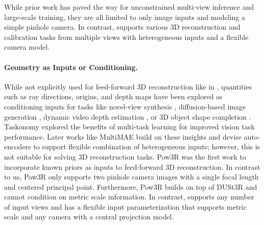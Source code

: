 While prior work has paved the way for unconstrained multi-view inference and large-scale training, they are all limited to only image inputs and modeling a simple pinhole camera. %
In contrast, \coolname supports various 3D reconstruction and calibration tasks from multiple views with heterogeneous inputs and a flexible camera model.


\paragraph{Geometry as Inputs or Conditioning.}

While not explicitly used for feed-forward 3D reconstruction like in \coolname,
quantities such as ray directions, origins, and depth maps have been explored as conditioning inputs for tasks like novel-view synthesis
\cite{JinJTZBZLSX2025, LuZFNTQCYL2025, WeberMKAZKR2026, ZhouGVVYBTRJ2025}, 
diffusion-based image generation
\cite{MouWXWZQSQ2024, ZhangRA2023}, 
dynamic video depth estimation \cite{LuHLDLCDYWL2025}, or
3D object shape completion \cite{DuistOWBRI2025}.
Taskonomy \cite{ZamirSSGMS2018} explored
the benefits of multi-task learning for improved vision task performance.
Later works like MultiMAE \cite{BachmMAZ2022} build on these insights and devise auto-encoders to support flexible combination of heterogeneous inputs; however, this is not suitable for solving 3D reconstruction tasks.
Pow3R \cite{JangWLAR2025} was the first work to incorporate known priors as inputs to feed-forward 3D reconstruction.
In contrast to us, Pow3R only supports two pinhole camera images with a single focal length and centered principal point.
Furthermore, Pow3R builds on top of DUSt3R and cannot condition on metric scale information.
In contrast, \coolname supports any number of input views and has a flexible input parameterization that supports metric scale and any camera with a central projection model.
